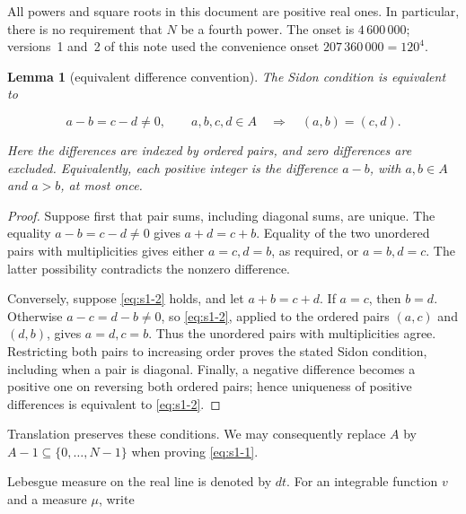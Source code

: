 \documentclass[10pt]{article}
\makeatletter
\numberwithin{equation}{section}
\newtheorem{lemma}[theorem]{Lemma}
\theoremstyle{remark}
\renewcommand\section{\@startsection{section}{1}{\z@}{-2.6ex \@plus -.8ex \@minus -.2ex}{1.3ex \@plus .2ex}{\normalfont\large\bfseries}}
\makeatother
\begin{document}
All powers and square roots in this document are positive real ones. In
particular, there is no requirement that \(N\) be a fourth power. The onset is
\(4\,600\,000\); versions~1 and~2 of this note used the convenience onset
\(207\,360\,000=120^4\).

\begin{lemma}[equivalent difference convention]\label{lem:1} The Sidon condition is
equivalent to

\begin{equation}
a-b=c-d\ne0,\qquad a,b,c,d\in A
\quad\Longrightarrow\quad (a,b)=(c,d).
\label{eq:s1-2}
\end{equation}

Here the differences are indexed by ordered pairs, and zero differences are
excluded. Equivalently, each positive integer is the difference \(a-b\), with
\(a,b\in A\) and \(a>b\), at most once.

\end{lemma}

\begin{proof} Suppose first that pair sums, including diagonal sums, are unique.
The equality \(a-b=c-d\ne0\) gives \(a+d=c+b\). Equality of the two unordered
pairs with multiplicities gives either \(a=c,d=b\), as required, or
\(a=b,d=c\). The latter possibility contradicts the nonzero difference.

Conversely, suppose \eqref{eq:s1-2} holds, and let \(a+b=c+d\). If \(a=c\), then
\(b=d\). Otherwise \(a-c=d-b\ne0\), so \eqref{eq:s1-2}, applied to the ordered pairs
\((a,c)\) and \((d,b)\), gives \(a=d,c=b\). Thus the unordered pairs with
multiplicities agree. Restricting both pairs to increasing order proves the
stated Sidon condition, including when a pair is diagonal. Finally, a
negative difference becomes a positive one on reversing both ordered pairs;
hence uniqueness of positive differences is equivalent to \eqref{eq:s1-2}. \end{proof}

Translation preserves these conditions. We may consequently replace \(A\)
by \(A-1\subseteq\{0,\ldots,N-1\}\) when proving \eqref{eq:s1-1}.

\section{Kernel and energy}\label{sec:kernel}

Lebesgue measure on the real line is denoted by \(dt\). For an integrable
function \(v\) and a measure \(\mu\), write
\end{document}

